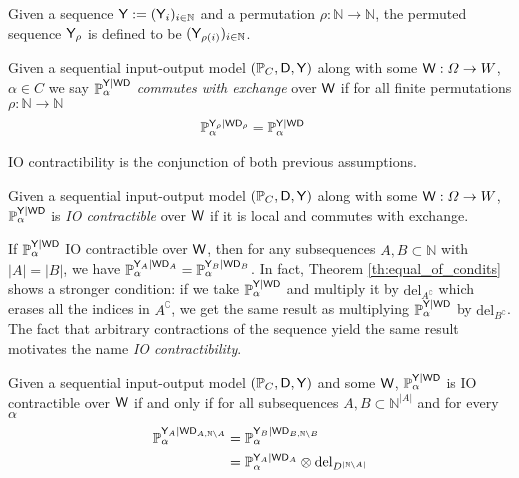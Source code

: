 \begin{notation}
Given a sequence $\mathsf{Y}:=(\mathsf{Y}_i)_{i\in \mathbb{N}}$ and a permutation $\rho:\mathbb{N}\to\mathbb{N}$, the permuted sequence $\mathsf{Y}_{\rho}$ is defined to be $(\mathsf{Y}_{\rho(i)})_{i\in\mathbb{N}}$.
\end{notation}

\begin{definition}\label{def:caus_exch}
Given a sequential input-output model $(\mathbb{P}_C,\mathsf{D},\mathsf{Y})$ along with some $\mathsf{W}:\Omega\to W$, $\alpha\in C$ we say $\mathbb{P}_\alpha^{\mathsf{Y}|\mathsf{WD}}$ \emph{commutes with exchange} over $\mathsf{W}$ if for all finite permutations $\rho:\mathbb{N}\to\mathbb{N}$
\begin{align}
    \mathbb{P}_\alpha^{\mathsf{Y}_\rho|\mathsf{WD}_\rho} &=  \mathbb{P}_\alpha^{\mathsf{Y}|\mathsf{WD}}
\end{align}
\end{definition}

IO contractibility is the conjunction of both previous assumptions.

\begin{definition}[IO contractibility]\label{def:ccontract}
Given a sequential input-output model $(\mathbb{P}_C,\mathsf{D},\mathsf{Y})$ along with some $\mathsf{W}:\Omega\to W$, $\mathbb{P}_\alpha^{\mathsf{Y}|\mathsf{WD}}$ is \emph{IO contractible} over $\mathsf{W}$ if it is local and commutes with exchange.
\end{definition}

If $\mathbb{P}_\alpha^{\mathsf{Y}|\mathsf{WD}}$ IO contractible over $\mathsf{W}$, then for any subsequences $A,B\subset\mathbb{N}$ with $|A|=|B|$, we have $\mathbb{P}_\alpha^{\mathsf{Y}_A|\mathsf{WD}_A}=\mathbb{P}_\alpha^{\mathsf{Y}_B|\mathsf{WD}_B}$. In fact, Theorem \ref{th:equal_of_condits} shows a stronger condition: if we take $\mathbb{P}_\alpha^{\mathsf{Y}|\mathsf{WD}}$ and multiply it by $\text{del}_{A^{\complement}}$ which erases all the indices in $A^{\complement}$, we get the same result as multiplying $\mathbb{P}_\alpha^{\mathsf{Y}|\mathsf{WD}}$ by $\text{del}_{B^{\complement}}$. The fact that arbitrary contractions of the sequence yield the same result motivates the name \emph{IO contractibility}. 

\begin{theorem}\label{th:equal_of_condits}
Given a sequential input-output model $(\mathbb{P}_C,\mathsf{D},\mathsf{Y})$ and some $\mathsf{W}$, $\mathbb{P}_\alpha^{\mathsf{Y}|\mathsf{WD}}$ is IO contractible over $\mathsf{W}$ if and only if for all subsequences $A,B\subset \mathbb{N}^{|A|}$ and for every $\alpha$
\begin{align}
    \mathbb{P}_\alpha^{\mathsf{Y}_A|\mathsf{WD}_{A,\mathbb{N}\setminus A}} &= \mathbb{P}_\alpha^{\mathsf{Y}_B|\mathsf{WD}_{B,\mathbb{N}\setminus B}}\\
    &= \mathbb{P}_\alpha^{\mathsf{Y}_A|\mathsf{WD}_A}\otimes \text{del}_{D^{|\mathbb{N}\setminus A|}}
\end{align}
\end{theorem}


